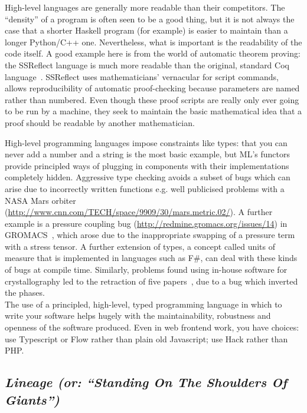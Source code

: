 \documentclass[a4paper,11pt]{article}
\begin{document}
High-level languages are generally more readable than their
competitors. The ``density'' of a program is often seen to be a good
thing, but it is not always the case that a shorter Haskell program
(for example) is easier to maintain than a longer Python/C++
one. Nevertheless, what is important is the readability of the code
itself. A good example here is from the world of automatic theorem
proving: the SSReflect language is much more readable than the
original, standard Coq language~\cite{GonthierZND13}. SSReflect uses
mathematicians' vernacular for script commands, allows reproducibility
of automatic proof-checking because parameters are named rather than
numbered.  Even though these proof scripts are really only ever going
to be run by a machine, they seek to maintain the basic mathematical
idea that a proof should be readable by another mathematician.

High-level programming languages impose constraints like types: that
you can never add a number and a string is the most basic example, but
ML's functors provide principled ways of plugging in components with
their implementations completely hidden. Aggressive type checking
avoids a subset of bugs which can arise due to incorrectly written
functions e.g. well publicised problems with a NASA Mars
orbiter (\url{http://www.cnn.com/TECH/space/9909/30/mars.metric.02/}).
A further example is a pressure coupling
bug (\url{http://redmine.gromacs.org/issues/14}) in
GROMACS~\cite{Hess2008}, which arose due to the inappropriate swapping
of a pressure term with a stress tensor.  A further extension of
types, a concept called units of measure that is implemented in
languages such as F\#, can deal with these kinds of bugs at compile
time. Similarly, problems found using in-house software for
crystallography led to the retraction of five
papers~\cite{Miller2006}, due to a bug which inverted the phases.\\

 The use of a
principled, high-level, typed programming language in which to write
your software helps hugely with the maintainability, robustness and
openness of the software produced. Even in web frontend work, you have
choices: use Typescript or Flow rather than plain old Javascript; use
Hack rather than PHP.

\subsection{{\emph{Lineage (or: ``Standing On The Shoulders Of Giants'')}}}
\end{document}
